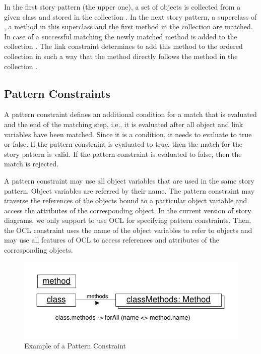 In the first story pattern (the upper one), a set of  objects is collected from a given class  and stored in the collection .
In the next story pattern, a superclass of , a method in this superclass and the first method in the collection  are matched.
In case of a successful matching the newly matched method  is added to the collection .
The link constraint  determines to add this method to the ordered collection in such a way
that the method  directly follows the method  in the collection .



{
\subsection{Pattern Constraints}
\label{sec:PatternConstraints}

A pattern constraint defines an additional condition for a match that is evaluated and the end of the matching step, i.e., it is evaluated after all object and link variables have been matched. Since it is a condition, it needs to evaluate to true or false. If the pattern constraint is evaluated to true, then the match for the story pattern is valid. If the pattern constraint is evaluated to false, then the match is rejected.

A pattern constraint may use all object variables that are used in the same story pattern. Object variables are referred by their name. The pattern constraint may traverse the references of the objects bound to a particular object variable and access the attributes of the corresponding object. In the current version of story diagrams, we only support to use OCL for specifying pattern constraints. Then, the OCL constraint uses the name of the object variables to refer to objects and may use all features of OCL to access references and attributes of the corresponding objects.

\begin{figure}[htbp]
\center
\includegraphics[width=0.6\columnwidth]{figures/PatternConstraint}
\caption{Example of a Pattern Constraint}
\label{fig:patternConstraint}
\end{figure}

}
